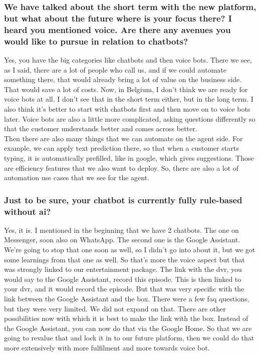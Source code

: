 \begin{appendices}
	\subsubsection{We have talked about the short term with the new platform, but what about the future where is your focus there?  I heard you mentioned voice. Are there any avenues you would like to pursue in relation to chatbots?}
	Yes, you have the big categories like chatbots and then voice bots. There we see, as I said, there are a lot of people who call us, and if we could automate something there, that would already bring a lot of value on the business side. That would save a lot of costs. Now, in Belgium, I don't think we are ready for voice bots at all. I don't see that in the short term either, but in the long term. I also think it's better to start with chatbots first and then move on to voice bots later. Voice bots are also a little more complicated, asking questions differently so that the customer understands better and comes across better.\\
	Then there are also many things that we can automate on the agent side. For example, we can apply text prediction there, so that when a customer starts typing, it is automatically prefilled, like in google, which gives suggestions. Those are efficiency features that we also want to deploy. So, there are also a lot of automation use cases that we see for the agent.
	
	\subsubsection{Just to be sure, your chatbot is currently fully rule-based without \acrshort{ai}?}
	Yes, it is. I mentioned in the beginning that we have 2 chatbots. The one on Messenger, soon also on WhatsApp. The second one is the Google Assistant. We're going to stop that one soon as well, so I didn't go into about it, but we got some learnings from that one as well. So that's more the voice aspect but that was strongly linked to our entertainment package. The link with the \gls{dvr}, you would say to the Google Assistant, record this episode. This is then linked to your \gls{dvr}, and it would record the episode. But that was very specific with the link between the Google Assistant and the box. There were a few \acrshort{faq} questions, but they were very limited. We did not expand on that. There are other possibilities now with which it is best to make the link with the box. Instead of the Google Assistant, you can now do that via the Google Home. So that we are going to revalue that and lock it in to our future platform, then we could do that more extensively with more fulfilment and more towards voice bot.
	

\end{appendices}
